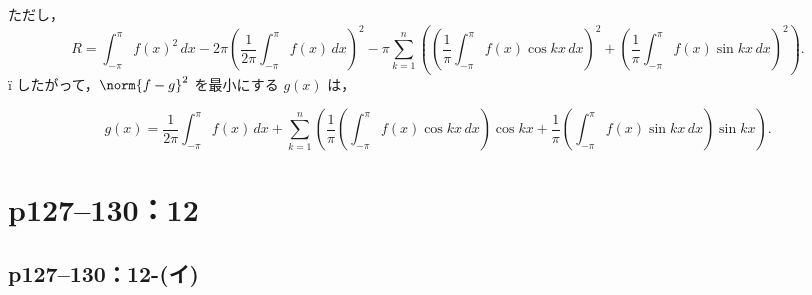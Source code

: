 \begin{tanswer}
  ただし，
  \[
    R= \int_{-\pi}^{\pi} f(x)^2 \, dx - 2\pi \left( \frac{1}{2\pi} \int_{-\pi}^{\pi} f(x) \, dx \right)^2 - \pi \sum_{k=1}^{n} \left( \left( \frac{1}{\pi} \int_{-\pi}^{\pi} f(x) \cos kx \, dx \right)^2 + \left( \frac{1}{\pi} \int_{-\pi}^{\pi} f(x) \sin kx \, dx \right)^2 \right).
  \]
  ï
  したがって，$\norm{f - g}^2$ を最小にする $g(x)$ は，

  \[
    g(x) = \frac{1}{2\pi} \int_{-\pi}^{\pi} f(x) \, dx + \sum_{k=1}^{n} \left(\frac{1}{\pi}  \left(\int_{-\pi}^{\pi} f(x) \cos kx \, dx \right) \cos kx + \frac{1}{\pi} \left(\int_{-\pi}^{\pi} f(x) \sin kx\,  dx \right) \sin kx \right).
  \]
\end{tanswer}




\section*{p127--130：12}


\subsection*{p127--130：12-(イ)}


